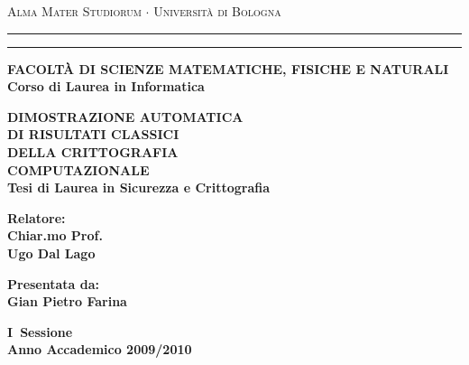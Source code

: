 \documentclass[12pt,a4paper]{report}
\begin{document}
\begin{titlepage}
\begin{center}
{{\Large{\textsc{Alma Mater Studiorum $\cdot$ Universit\`a di
Bologna}}}} \rule[0.1cm]{15.8cm}{0.1mm}
\rule[0.5cm]{15.8cm}{0.6mm}
{\small{\bf FACOLT\`A DI SCIENZE MATEMATICHE, FISICHE E NATURALI\\
Corso di Laurea in Informatica}}
\end{center}
\vspace{15mm}
\begin{center}
{\LARGE{\bf DIMOSTRAZIONE AUTOMATICA}}\\
\vspace{3mm}
{\LARGE{\bf DI RISULTATI CLASSICI}}\\
\vspace{3mm}
{\LARGE{\bf DELLA CRITTOGRAFIA}}\\
\vspace{3mm}
{\LARGE{\bf COMPUTAZIONALE}}\\
\vspace{19mm} {\large{\bf Tesi di Laurea in Sicurezza e Crittografia}}
\end{center}
\vspace{40mm}
\par
\noindent
\begin{minipage}[t]{0.47\textwidth}
{\large{\bf Relatore:\\
Chiar.mo Prof.\\
Ugo Dal Lago}}
\end{minipage}
\hfill
\begin{minipage}[t]{0.47\textwidth}\raggedleft
{\large{\bf Presentata da:\\
Gian Pietro Farina}}
\end{minipage}
\vspace{20mm}
\begin{center}
{\large{\bf I\textdegree \ Sessione\\%
Anno Accademico 2009/2010 }}%
\end{center}
\end{titlepage}
\end{document}
